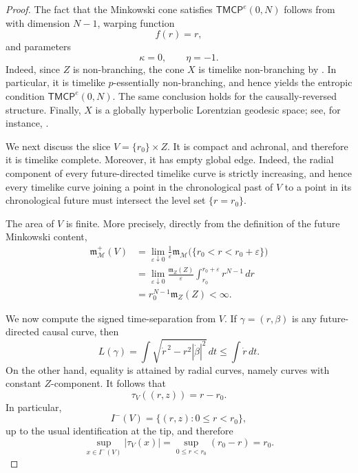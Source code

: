 \documentclass[a4paper,10pt]{article}
\newcommand{\TMCP}{\mathsf{TMCP}}
\newcommand{\mm}{\mathfrak m}
\theoremstyle{plain}
\theoremstyle{definition}
\numberwithin{equation}{section}
\begin{document}
\begin{proof}
 The fact that the Minkowski cone satisfies
\( \TMCP^e(0,N)\) follows from \cite[Theorem~5.2]{CalistiKettererSaemann} with dimension
$N-1$, warping function
\[
    f(r)=r,
\]
and parameters
\[
    \kappa=0,
    \qquad
    \eta=-1.
\]
Indeed, since $Z$ is non-branching, the cone $X$ is timelike
non-branching by
\cite[Remark~6.2]{CalistiKettererSaemann}. In particular, it is
timelike $p$-essentially non-branching, and hence
\cite[Remark~2.16]{CalistiKettererSaemann} yields the entropic
condition
\(  \TMCP^e(0,N). \)
The same conclusion holds for the causally-reversed structure.
Finally, $X$ is a globally hyperbolic Lorentzian geodesic space; see,
for instance, \cite[Theorem~3.17]{CalistiKettererSaemann}.

We next discuss the slice $V=\{r_0\}\times Z$. It is compact and
achronal, and therefore it is timelike complete. Moreover, it has
empty global edge. Indeed, the radial component of every
future-directed timelike curve is strictly increasing, and hence
every timelike curve joining a point in the chronological past of
$V$ to a point in its chronological future must intersect the level
set $\{r=r_0\}$.

The area of $V$ is finite. More precisely, directly from the
definition of the future Minkowski content,
\begin{align*}
    \mm_{\mathcal M}^+(V)
    &=
    \lim_{\varepsilon\downarrow0}
    \frac{1}{\varepsilon}
    \mm_{\mathcal M}\bigl(\{r_0<r<r_0+\varepsilon\}\bigr)\\
    &=
    \lim_{\varepsilon\downarrow0}
    \frac{\mm_Z(Z)}{\varepsilon}
    \int_{r_0}^{r_0+\varepsilon}r^{N-1}\,dr\\
    &=
    r_0^{N-1}\mm_Z(Z)
    <\infty.
\end{align*}

We now compute the signed time-separation from $V$. If
$\gamma=(r,\beta)$ is any future-directed causal curve, then
\[
    L(\gamma)
    =
    \int
    \sqrt{\dot r^{\,2}-r^2|\dot\beta|^2}\,dt
    \leq
    \int \dot r\,dt.
\]
On the other hand, equality is attained by radial curves, namely
curves with constant $Z$-component. It follows that
\begin{equation}\label{eq:tauV-cone}
    \tau_V((r,z))=r-r_0.
\end{equation}
In particular,
\[
    I^-(V)=\{(r,z):0\leq r<r_0\},
\]
up to the usual identification at the tip, and therefore
\begin{equation}\label{eq:past-distance-cone}
    \sup_{x\in I^-(V)}|\tau_V(x)|
    =
    \sup_{0\leq r<r_0}(r_0-r)
    =
    r_0.
\end{equation}


\end{proof}
\end{document}
